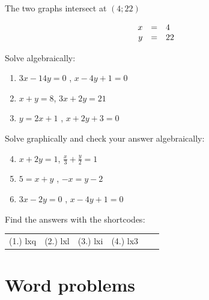 \begin{wex}
{
The two graphs intersect at $(4;22)$ 

\begin{equation*}
\begin{array}{ccl}\hfill x& =& 4\hfill \\ \hfill y& =& 22\hfill \end{array}
\end{equation*}

}
\end{wex}


\begin{exercises}{}
{
 
\item Solve algebraically: 
\begin{enumerate}[noitemsep, label=\textbf{\arabic*}. ] 
\item $3x-14y=0$ , $x-4y+1=0$
\item $x+y=8$, $3x + 2y = 21$
\item $y=2x+1$ , $x + 2y + 3 = 0$
\end{enumerate}

Solve graphically and check your answer algebraically:

\begin{enumerate}[noitemsep, label=\textbf{\arabic*}. ] 
\setcounter{enumi}{3}
\item  $x+2y=1$, $\frac{x}{3} + \frac{y}{2} = 1$
\item $5= x+y$ , $-x = y-2$
\item $3x - 2y = 0$ , $x - 4y + 1 = 0$

\end{enumerate}


\par {} Find the answers with the shortcodes:
\par \begin{tabular}[h]{cccccc}
(1.) lxq  &  (2.) lxl  &  (3.) lxi  &  (4.) lx3  & \end{tabular}
}
\end{exercises}

\section{Word problems}


